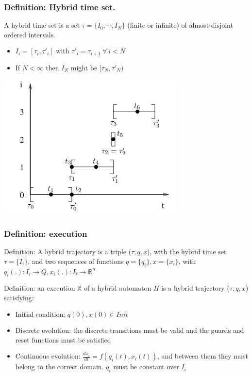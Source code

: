 \documentclass{beamer}
\begin{document}
\begin{frame}
	\frametitle{Definition: Hybrid time set.}
	
	A hybrid time set is a set $\tau = \{I_0,\cdots,I_N\}$ (finite or infinite) of almost-disjoint ordered intervals.
	\begin{itemize}
		\item $I_i = [\tau_i, \tau'_i]$ with $\tau'_i = \tau_{i+1}\ \forall\ i < N$
		\item If $N < \infty$ then $I_N$ might be $[\tau_N, \tau'_N)$
	\end{itemize}	 
	\includegraphics[scale=0.7]{partition.png}
\end{frame}

\begin{frame}
	\frametitle{Definition: execution}
	
	Definition: A hybrid trajectory is a triple ($\tau,q,x$), with the hybrid time set $\tau = \{I_i\}$, and two sequences of functions $q = \{q_i\}, x = \{x_i\}$, with $q_i(.) : I_i \rightarrow Q,x_i(.) : I_i \rightarrow \mathbb{R}^n$
	
	Definition: an execution $\mathbb{X}$ of a hybrid automaton $H$ is a hybrid trajectory ($\tau,q,x$) satisfying:
	\begin{itemize}
		\item Initial condition: $q(0),x(0) \in Init$
		\item Discrete evolution: the discrete transitions must be valid and the guards and reset functions must be satisfied
		\item Continuous evolution: $\frac{dx_i}{dt} = f(q_i(t),x_i(t))$, and between them they must belong to the correct domain. $q_i$ must be constant over $I_i$
	\end{itemize}
\end{frame}
\end{document}
